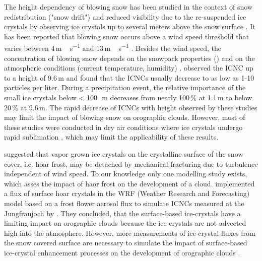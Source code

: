 \documentclass[draft,linenumbers]{agujournal}
\begin{document}
The height dependency of blowing snow has been studied in the context of snow redistribution ("snow drift") and reduced visibility due to the re-suspended ice crystals by observing ice crystals up to several meters above the snow surface \citep{Sch82, Nis05}. It has been reported that blowing snow occurs above a wind speed threshold that varies between 4\,\si{m\,s^{-1}} and 13\,\si{m\,s^{-1}} \citep{Bro88, Li97, Mah03, Der99}. Besides the wind speed, the concentration of blowing snow depends on the snowpack properties () and on the atmospheric conditions (current temperature, humidity) \citep{Vio13}. \citet{Nis05} observed the ICNC up to a height of 9.6\,\si{m} and found that the ICNCs usually decrease to as low as 1-10 particles per liter. During a precipitation event, the relative importance of the small ice crystals below < 100\,\si{\mu m} decreases from nearly 100\,\si{\%} at 1.1\,\si{m} to below 20\,\si{\%} at 9.6\,\si{m}. The rapid decrease of ICNCs with height observed by these studies may limit the impact of blowing snow on orographic clouds. However, most of these studies were conducted in dry air conditions where ice crystals undergo rapid sublimation \citep{Yan08}, which may limit the applicability of these results.

\citet{Loy15} suggested that vapor grown ice crystals on the crystalline surface of the snow cover, i.e. hoar frost, may be detached by mechanical fracturing due to turbulence independent of wind speed. To our knowledge only one modelling study exists, which asses the impact of haor frost on the development of a cloud. \citet{Far15} implemented a flux of surface hoar crystals in the WRF (Weather Research and Forecasting) model based on a frost flower aerosol flux to simulate ICNCs measured at the Jungfraujoch by \citet{Loy15}. They concluded, that the surface-based ice-crystals have a limiting impact on orographic clouds because the ice crystals are not advected high into the atmosphere. However, more measurements of ice-crystal fluxes from the snow covered surface are necessary to simulate the impact of surface-based ice-crystal enhancement processes on the development of orographic clouds \citep{Far15}.
\end{document}
